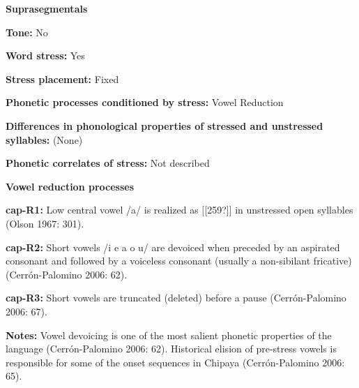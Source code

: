 \begin{styleBody}
\textbf{Suprasegmentals}
\end{styleBody}

\begin{styleBody}
\textbf{Tone:} No
\end{styleBody}

\begin{styleBody}
\textbf{Word stress: }Yes
\end{styleBody}

\begin{styleBody}
\textbf{Stress placement:} Fixed
\end{styleBody}

\begin{styleBody}
\textbf{Phonetic processes conditioned by stress:} Vowel Reduction
\end{styleBody}

\begin{styleBody}
\textbf{Differences in phonological properties of stressed and unstressed syllables:} (None)
\end{styleBody}

\begin{styleBody}
\textbf{Phonetic correlates of stress: }Not described
\end{styleBody}

\begin{styleBody}
\textbf{Vowel reduction processes}
\end{styleBody}

\begin{styleBody}
\textbf{cap-R1:} Low central vowel /a/ is realized as [[259?]] in unstressed open syllables (Olson 1967: 301).
\end{styleBody}

\begin{styleBody}
\textbf{cap-R2:} Short vowels /i e a o u/ are devoiced when preceded by an aspirated consonant and followed by a voiceless consonant (usually a non-sibilant fricative) (Cerrón-Palomino 2006: 62).
\end{styleBody}

\begin{styleBody}
\textbf{cap-R3:} Short vowels are truncated (deleted) before a pause (Cerrón-Palomino 2006: 67).
\end{styleBody}

\begin{styleBody}
\textbf{Notes: }Vowel devoicing is one of the most salient phonetic properties of the language (Cerrón-Palomino 2006: 62). Historical elision of pre-stress vowels is responsible for some of the onset sequences in Chipaya (Cerrón-Palomino 2006: 65).
\end{styleBody}

